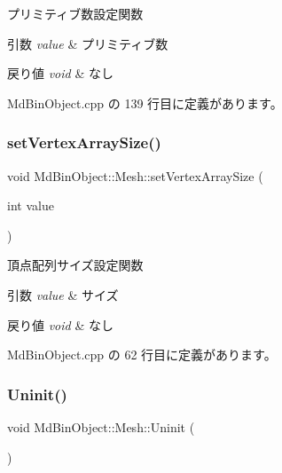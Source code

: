 プリミティブ数設定関数 


\begin{DoxyParams}{引数}
{\em value} & プリミティブ数 \\
\hline
\end{DoxyParams}

\begin{DoxyRetVals}{戻り値}
{\em void} & なし \\
\hline
\end{DoxyRetVals}


 Md\+Bin\+Object.\+cpp の 139 行目に定義があります。

\mbox{\label{class_md_bin_object_1_1_mesh_ac603b4494f9b2ad2e18ee0fb97e88bab}} 
\subsubsection{\texorpdfstring{set\+Vertex\+Array\+Size()}{setVertexArraySize()}}
{\footnotesize\ttfamily void Md\+Bin\+Object\+::\+Mesh\+::set\+Vertex\+Array\+Size (\begin{DoxyParamCaption}\item[{int}]{value }\end{DoxyParamCaption})}



頂点配列サイズ設定関数 


\begin{DoxyParams}{引数}
{\em value} & サイズ \\
\hline
\end{DoxyParams}

\begin{DoxyRetVals}{戻り値}
{\em void} & なし \\
\hline
\end{DoxyRetVals}


 Md\+Bin\+Object.\+cpp の 62 行目に定義があります。

\mbox{\label{class_md_bin_object_1_1_mesh_a05413005511d6715ce8ea9142b257e7a}} 
\subsubsection{\texorpdfstring{Uninit()}{Uninit()}}
{\footnotesize\ttfamily void Md\+Bin\+Object\+::\+Mesh\+::\+Uninit (\begin{DoxyParamCaption}{ }\end{DoxyParamCaption})}



